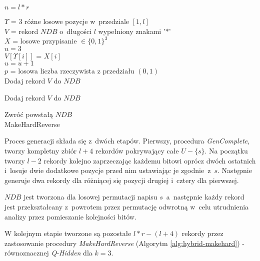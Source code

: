 \begin{algorithm}[!htb]
    \SetAlgoLined
    $n = l * r$\\
    {
        $\Upsilon$ = $3$ różne losowe pozycje w~przedziale $[1, l]$\\
        $V$ = rekord $NDB$ o~długości $l$ wypełniony znakami '$*$'\\
        $X$ = losowe przypisanie $\in \{0,1\}^3$\\ 
        
        $u = 3$\\ 
        {
            $V[\Upsilon[i]]$ = $X[i]$\\  
            {
                $u = u + 1$\\
            }
        }    
        {
            $p$ = losowa liczba rzeczywista z przedziału $(0,1)$\\
            {
                Dodaj rekord $V$ do $NDB$\\
            }    
        }
        
        Dodaj rekord $V$ do $NDB$
    } 
    
    Zwróć powstałą $NDB$\\
    \caption{MakeHardReverse}
    \label{alg:hybrid-makehard}
\end{algorithm}

Proces generacji składa się z~dwóch etapów. Pierwszy, procedura \textit{GenComplete}, tworzy kompletny zbiór $l + 4$ rekordów pokrywający
całe $U - \{s\}$. Na początku tworzy $l-2$ rekordy kolejno zaprzeczając każdemu bitowi oprócz dwóch ostatnich
i~losuje dwie dodatkowe pozycje przed nim ustawiając je zgodnie~z~$s$.
Następnie generuje dwa rekordy dla różniącej się pozycji drugiej i~cztery dla pierwszej.

$NDB$ jest tworzona dla losowej permutacji napisu $s$~a~następnie każdy rekord 
jest przekształcany z~powrotem przez permutację odwrotną w~celu utrudnienia analizy przez pomieszanie kolejności bitów.

W kolejnym etapie tworzone są pozostałe $l*r - (l+4)$ rekordy przez zastosowanie procedury \textit{MakeHardReverse} (Algorytm \ref{alg:hybrid-makehard}) - równoznacznej
\textit{Q-Hidden} dla $k=3$. 


